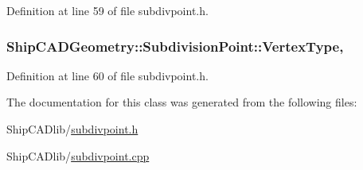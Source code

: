 Definition at line 59 of file subdivpoint.\-h.

\hypertarget{classShipCADGeometry_1_1SubdivisionPoint_a194e5f0d73d3af0bd21fa3cd4fa03296}{
\subsubsection[{Vertex\-Type}]{ Ship\-C\-A\-D\-Geometry\-::\-Subdivision\-Point\-::\-Vertex\-Type\hspace{0.3cm}{\ttfamily [read]}, {\ttfamily [write]}}}\label{classShipCADGeometry_1_1SubdivisionPoint_a194e5f0d73d3af0bd21fa3cd4fa03296}


Definition at line 60 of file subdivpoint.\-h.



The documentation for this class was generated from the following files\-:\begin{DoxyCompactItemize}
\item 
Ship\-C\-A\-Dlib/\hyperlink{subdivpoint_8h}{subdivpoint.\-h}\item 
Ship\-C\-A\-Dlib/\hyperlink{subdivpoint_8cpp}{subdivpoint.\-cpp}\end{DoxyCompactItemize}
